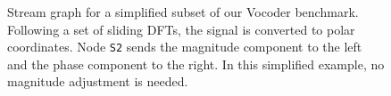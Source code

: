 
\begin{figure}[t]
\centering
{}
\vspace{-24pt}
\caption{Stream graph for a simplified subset of our Vocoder
benchmark.  Following a set of sliding DFTs, the signal is converted
to polar coordinates.  Node {\tt S2} sends the magnitude component to
the left and the phase component to the right.  In this simplified
example, no magnitude adjustment is needed.\label{fig:vocoder}}
\vspace{-12pt}
\end{figure}

\begin{figure*}[t]
\caption{Parallel execution models for stream programs.  Each block corresponds to a filter in the Vocoder example (Figure~\ref{fig:vocoder}).  The height of the block reflects the amount of work contained in the filter.\label{fig:exemodel}}
\end{figure*}
